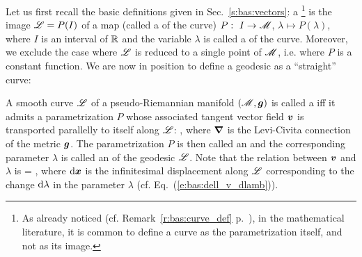 Let us first recall the basic definitions given in Sec.~\ref{s:bas:vectors}:
a \footnote{As already noticed (cf. Remark~\ref{r:bas:curve_def} p.~\pageref{r:bas:curve_def}), in the mathematical literature, it is common to define
a curve as the parametrization itself, and not as its image.}
is the image $\mathscr{L}=P(I)$
of a map (called a  of the curve)
$P:\ I\rightarrow \mathscr{M}$, $\lambda\mapsto P(\lambda)$,
where $I$ is an interval of $\mathbb{R}$ and the variable $\lambda$ is called a
 of the curve.
Moreover, we exclude the case where $\mathscr{L}$ is reduced to a single point
of $\mathscr{M}$, i.e. where $P$ is a constant function.
We are now in position to define a geodesic as a ``straight'' curve:

\begin{greybox}
A smooth curve $\mathscr{L}$ of a pseudo-Riemannian manifold $(\mathscr{M},\bm{g})$ is
called a  iff it admits a parametrization $P$ whose associated
tangent vector field $\bm{v}$ is transported parallelly to itself along
$\mathscr{L}$:
\be \label{e:geo:geod_eq_v}
    ,
\ee
where $\bm{\nabla}$ is the Levi-Civita connection of the metric $\bm{g}$.
The parametrization $P$ is then called an
and the corresponding parameter $\lambda$ is called an
 of the
geodesic $\mathscr{L}$. Note that the relation between $\bm{v}$ and $\lambda$ is
\be \label{e:geo:v_dxdlambda}
     =  ,
\ee
where $\mathrm{d}\bm{x}$ is the infinitesimal displacement along $\mathscr{L}$ corresponding
to the change $\mathrm{d}\lambda$ in the parameter $\lambda$
(cf. Eq.~(\ref{e:bas:dell_v_dlamb})).
\end{greybox}

